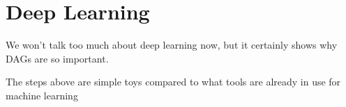 \documentclass[letterpaper,10pt,english]{sphinxmanual}
\begin{document}
\begin{sphinxVerbatim}[commandchars=\\\{\}]
   
\end{sphinxVerbatim}

\begin{sphinxVerbatim}[commandchars=\\\{\}]
   
\end{sphinxVerbatim}

\begin{sphinxVerbatim}[commandchars=\\\{\}]
   
   
\end{sphinxVerbatim}


\section{Deep Learning}
\label{\detokenize{01-Introduction:deep-learning}}
\sphinxAtStartPar
We won’t talk too much about deep learning now, but it certainly shows why DAGs are so important.

\sphinxAtStartPar
The steps above are simple toys compared to what tools are already in use for machine learning

\sphinxAtStartPar
{}
\end{document}
